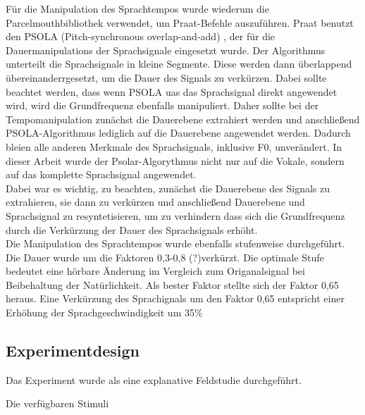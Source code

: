 \documentclass[11pt,a4paper,headsepline,twoside,toc=bibliography]{scrreprt}
\begin{document}

Für die Manipulation des Sprachtempos wurde wiederum die Parcelmouthbibliothek verwendet, um Praat-Befehle auszuführen.
Praat benutzt den PSOLA (Pitch-synchronous overlap-and-add) \autocite{Charpentier1989}, der für die Dauermanipulations der Sprachsignale eingesetzt wurde. Der Algorithmus unterteilt die Sprachsignale in kleine Segmente. Diese werden dann überlappend übereinanderrgesetzt, um die Dauer des Signals zu verkürzen. Dabei sollte beachtet werden, dass wenn PSOLA uas das Sprachsignal direkt angewendet wird, wird die Grundfrequenz ebenfalls manipuliert. Daher sollte bei der Tempomanipulation zunächst die Dauerebene extrahiert werden und anschließend PSOLA-Algorithmus lediglich auf die Dauerebene angewendet werden. Dadurch bleien alle anderen Merkmale des Sprachsignals, inklusive F0, unverändert.
In dieser Arbeit wurde der Psolar-Algorythmus nicht nur auf die Vokale, sondern auf das komplette Sprachsignal angewendet.\\

Dabei war es wichtig, zu beachten, zunächst die Dauerebene des Signals zu extrahieren, sie dann zu verkürzen und anschließend Dauerebene und Sprachsignal zu resyntetisieren, um zu verhindern dass sich die Grundfrequenz durch die Verkürzung der Dauer des Sprachsignals erhöht.\\

Die Manipulation des Sprachtempos wurde ebenfalls stufenweise durchgeführt. Die Dauer wurde um die Faktoren 0,3-0,8 (?)verkürzt.
Die optimale Stufe bedeutet eine hörbare Änderung im Vergleich zum Origanalsignal bei Beibehaltung der Natürlichkeit.
Als bester Faktor stellte sich der Faktor 0,65 heraus.
Eine Verkürzung des Sprachignals um den Faktor 0,65 entspricht einer Erhöhung der Sprachgeschwindigkeit um 35\%




\subsection{Experimentdesign}
\label{sec:experiment_design}

Das Experiment wurde als eine explanative Feldstudie durchgeführt. 
\newline


Die verfügbaren Stimuli 
\end{document}
